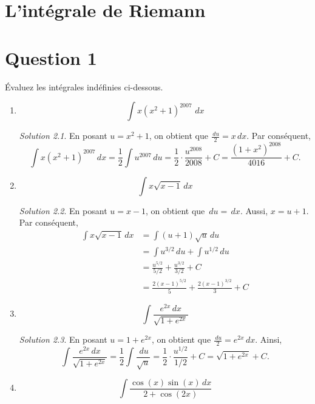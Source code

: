 \documentclass[
  12pt,
  letterpaper,
]{book}
\theoremstyle{remark}
\newtheorem*{solution}{Solution}
\begin{document}
\hypertarget{lintuxe9grale-de-riemann-1}{%
\chapter{L'intégrale de Riemann}\label{lintuxe9grale-de-riemann-1}}

\hypertarget{question-1-2}{%
\chapter{Question 1}\label{question-1-2}}

Évaluez les intégrales indéfinies ci-dessous.

\begin{enumerate}
\item
  \[\int x(x^2+1)^{2007}\,\,dx\]

  \begin{solution}

  En posant \(u=x^2+1\), on obtient que \(\frac{\,du}{2}=x\,dx\). Par
  conséquent,
  \[\int x(x^2+1)^{2007}\,dx=\frac{1}{2}\int u^{2007}\,du=\frac{1}{2}\cdot\frac{u^{2008}}{2008}+C=\frac{(1+x^2)^{2008}}{4016}+C.\]

  \end{solution}
\item
  \[\int x\sqrt{x-1}\,dx\]

  \begin{solution}

  En posant \(u=x-1\), on obtient que \(\,du=\,dx\). Aussi, \(x=u+1\).
  Par conséquent, \begin{align}
  \int x\sqrt{x-1}\,dx&=\int (u+1)\sqrt{u}\,du \\
  &=\int u^{3/2}\,du+\int u^{1/2}\,du \\
  &=\frac{u^{5/2}}{5/2}+\frac{u^{3/2}}{3/2}+C \\
  &=\frac{2(x-1)^{5/2}}{5}+\frac{2(x-1)^{3/2}}{3}+C
  \end{align}

  \end{solution}
\item
  \[\int\frac{e^{2x}\,dx}{\sqrt{1+e^{2x}}}\]

  \begin{solution}

  En posant \(u=1+e^{2x}\), on obtient que
  \(\frac{\,du}{2}=e^{2x}\,dx\). Ainsi,
  \[\int\frac{e^{2x}\,dx}{\sqrt{1+e^{2x}}}=\frac{1}{2}\int\frac{\,du}{\sqrt{u}}=\frac{1}{2}\cdot\frac{u^{1/2}}{1/2}+C=\sqrt{1+e^{2x}}+C.\]

  \end{solution}
\item
  \[\int\frac{\cos(x)\sin(x)\,dx}{2+\cos(2x)}\]


\end{enumerate}
\end{document}

